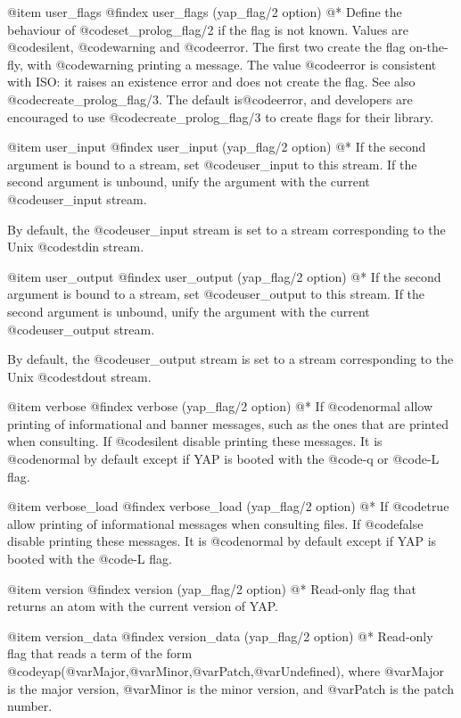 {{{{{{{{{@item user_flags
@findex user_flags  (yap_flag/2 option)
@*
Define the behaviour of @code{set_prolog_flag/2} if the flag is not known. Values are @code{silent}, @code{warning} and @code{error}. The first two create the flag on-the-fly, with @code{warning} printing a message. The value @code{error} is consistent with ISO: it raises an existence error and does not create the flag. See also @code{create_prolog_flag/3}. The default is@code{error}, and developers are encouraged to use @code{create_prolog_flag/3} to create flags for their library.

@item user_input
@findex user_input (yap_flag/2 option)
@*
If the second argument is bound to a stream, set @code{user_input} to
this stream. If the second argument is unbound, unify the argument with
the current @code{user_input} stream.

By default, the @code{user_input} stream is set to a stream
corresponding to the Unix @code{stdin} stream.

@item user_output
@findex user_output (yap_flag/2 option)
@*
If the second argument is bound to a stream, set @code{user_output} to
this stream. If the second argument is unbound, unify the argument with
the current @code{user_output} stream.

By default, the @code{user_output} stream is set to a stream
corresponding to the Unix @code{stdout} stream.

@item  verbose
@findex verbose (yap_flag/2 option)
@*
If @code{normal} allow printing of informational and banner messages,
such as the ones that are printed when consulting. If @code{silent}
disable printing these messages. It is @code{normal} by default except if
YAP is booted with the @code{-q} or @code{-L} flag.

@item  verbose_load
@findex verbose_load (yap_flag/2 option)
@* If @code{true} allow printing of informational messages when
consulting files. If @code{false} disable printing these messages. It
is @code{normal} by default except if YAP is booted with the @code{-L}
flag.

@item version
@findex version (yap_flag/2 option)
@* Read-only flag that returns an atom with the current version of
YAP.

@item version_data
@findex version_data (yap_flag/2 option)
@* Read-only flag that reads a term of the form
@code{yap}(@var{Major},@var{Minor},@var{Patch},@var{Undefined}), where
@var{Major} is the major version, @var{Minor} is the minor version,
and @var{Patch} is the patch number.

}}}}}}}}}
